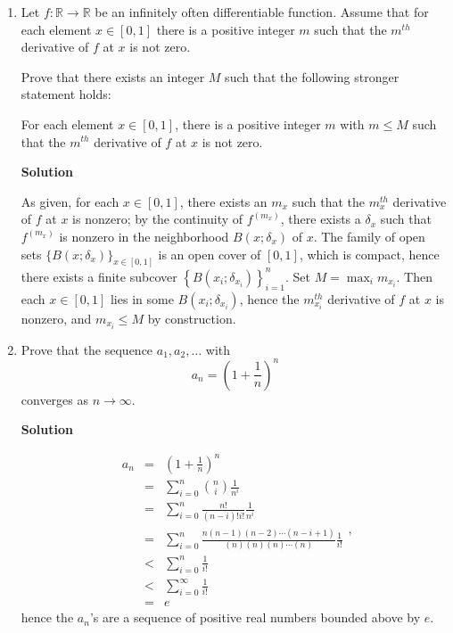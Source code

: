 \documentclass{article}
\begin{document}
\begin{enumerate}
\item Let \(f : \mathbb{R} \to \mathbb{R}\) be an infinitely often differentiable function.  Assume that for each element \(x \in [0,1]\) there is a positive integer \(m\) such that the \(m^{th}\) derivative of \(f\) at \(x\) is not zero.

Prove that there exists an integer \(M\) such that the following stronger statement holds:

For each element \(x \in [0,1]\), there is a positive integer \(m\) with \(m \leq M\) such that the \(m^{th}\) derivative of \(f\) at \(x\) is not zero.

{\bf Solution}

As given, for each \(x \in [0,1]\), there exists an \(m_x\) such that the \(m_x^{th}\) derivative of \(f\) at \(x\) is nonzero; by the continuity of \(f^{(m_x)}\), there exists a \(\delta_x\) such that \(f^{(m_x)}\) is nonzero in the neighborhood \(B(x; \delta_x)\) of \(x\).  The family of open sets \(\{B(x; \delta_x)\}_{x \in [0,1]}\) is an open cover of \([0,1]\), which is compact, hence there exists a finite subcover \(\left\{ B \left( x_i; \delta_{x_i} \right) \right\}_{i = 1}^n\).  Set \(M = \max_i m_{x_i}\).  Then each \(x \in [0,1]\) lies in some \(B \left( x_i; \delta_{x_i} \right)\), hence the \(m_{x_i}^{th}\) derivative of \(f\) at \(x\) is nonzero, and \(m_{x_i} \leq M\) by construction.



\item Prove that the sequence \(a_1, a_2, \ldots\) with
\[a_n = \left( 1 + \frac{1}{n} \right)^n\]
converges as \(n \to \infty\).

{\bf Solution}

\[\begin{array}{rcl}
  a_n & = & \left( 1 + \frac{1}{n} \right)^n \\
      & = & \sum_{i = 0}^n \binom{n}{i} \frac{1}{n^i} \\
      & = & \sum_{i = 0}^n \frac{n!}{(n - i)!i!} \frac{1}{n^i} \\
      & = & \sum_{i = 0}^n \frac{n (n - 1) (n - 2) \cdots (n - i + 1)}{(n) (n) (n) \cdots (n)} \frac{1}{i!} \\
      & < & \sum_{i = 0}^n \frac{1}{i!} \\
      & < & \sum_{i = 0}^{\infty} \frac{1}{i!} \\
      & = & e
  \end{array},\]
hence the \(a_n\)'s are a sequence of positive real numbers bounded above by \(e\).




\end{enumerate}
\end{document}
